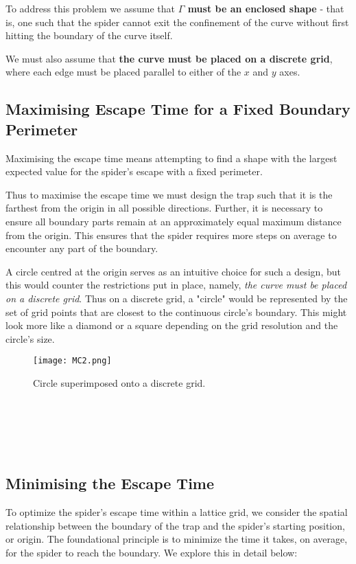 \documentclass[12pt,a4paper]{article}
\begin{document}
To address this problem we assume that \textbf{\(\Gamma\) must be an enclosed shape} - that is, one such that the spider cannot exit the confinement of the curve without first hitting the boundary of the curve itself. 

We must also assume that \textbf{the curve must be placed on a discrete grid}, where each edge must be placed parallel to either of the \(x\) and \(y\) axes.

\subsection{Maximising Escape Time for a Fixed Boundary Perimeter}

Maximising the escape time means attempting to find a shape with the largest expected value for the spider's escape with a fixed 
perimeter.

Thus to maximise the escape time we must design the trap such that it is the farthest from the origin in all possible directions.
Further, it is necessary to ensure all boundary parts remain at an approximately equal maximum distance from the origin. This ensures that the spider requires more steps on average to encounter any part of the boundary.

A circle centred at the origin serves as an intuitive choice for such a design, but this would counter the restrictions put in place, namely, \textit{the curve must be placed on a discrete grid}. Thus on a discrete grid, a "circle" would be represented by the set of grid points that are closest to the continuous circle's boundary. This might look more like a diamond or a square depending on the grid resolution and the circle's size. 

\begin{figure}[htbp]
    \centering
    \texttt{[image: MC2.png]}
    \caption{Circle superimposed onto a discrete grid.}
    \label{fig:MSRC2}
\end{figure}
\\
\\
\\
\\

\subsection{Minimising the Escape Time}

To optimize the spider's escape time within a lattice grid, we consider the spatial relationship between the boundary of the trap and the spider's starting position, or origin. The foundational principle is to minimize the time it takes, on average, for the spider to reach the boundary. We explore this in detail below:
\end{document}
